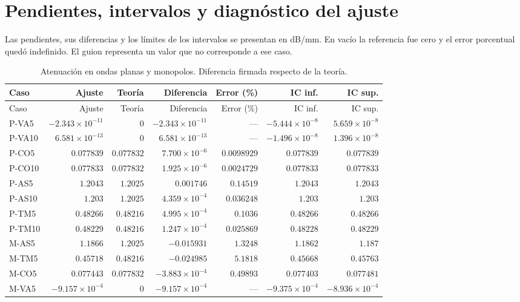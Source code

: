 \section{Pendientes, intervalos y diagnóstico del ajuste}
Las pendientes, sus diferencias y los límites de los intervalos se presentan en dB/mm. En vacío la referencia fue cero y el error porcentual quedó indefinido. El guion representa un valor que no corresponde a ese caso.
\begingroup\small\setlength{\tabcolsep}{4pt}
\begin{longtable}{lrrrrrr}
\caption{Atenuación en ondas planas y monopolos. Diferencia firmada respecto de la teoría.}\label{t:atte}\\
\hline Caso & Ajuste & Teoría & Diferencia & Error (\%) & IC inf. & IC sup. \\ \hline\endfirsthead
\hline Caso & Ajuste & Teoría & Diferencia & Error (\%) & IC inf. & IC sup. \\ \hline\endhead
P-VA5 & $-2.343\times 10^{-11}$ & $0$ & $-2.343\times 10^{-11}$ & --- & $-5.444\times 10^{-8}$ & $5.659\times 10^{-8}$ \\
P-VA10 & $6.581\times 10^{-13}$ & $0$ & $6.581\times 10^{-13}$ & --- & $-1.496\times 10^{-8}$ & $1.396\times 10^{-8}$ \\
P-CO5 & $0.077839$ & $0.077832$ & $7.700\times 10^{-6}$ & $0.0098929$ & $0.077839$ & $0.077839$ \\
P-CO10 & $0.077833$ & $0.077832$ & $1.925\times 10^{-6}$ & $0.0024729$ & $0.077833$ & $0.077833$ \\
P-AS5 & $1.2043$ & $1.2025$ & $0.001746$ & $0.14519$ & $1.2043$ & $1.2043$ \\
P-AS10 & $1.203$ & $1.2025$ & $4.359\times 10^{-4}$ & $0.036248$ & $1.203$ & $1.203$ \\
P-TM5 & $0.48266$ & $0.48216$ & $4.995\times 10^{-4}$ & $0.1036$ & $0.48266$ & $0.48266$ \\
P-TM10 & $0.48229$ & $0.48216$ & $1.247\times 10^{-4}$ & $0.025869$ & $0.48228$ & $0.48229$ \\
M-AS5 & $1.1866$ & $1.2025$ & $-0.015931$ & $1.3248$ & $1.1862$ & $1.187$ \\
M-TM5 & $0.45718$ & $0.48216$ & $-0.024985$ & $5.1818$ & $0.45668$ & $0.45763$ \\
M-CO5 & $0.077443$ & $0.077832$ & $-3.883\times 10^{-4}$ & $0.49893$ & $0.077403$ & $0.077481$ \\
M-VA5 & $-9.157\times 10^{-4}$ & $0$ & $-9.157\times 10^{-4}$ & --- & $-9.375\times 10^{-4}$ & $-8.936\times 10^{-4}$ \\

\end{longtable}
